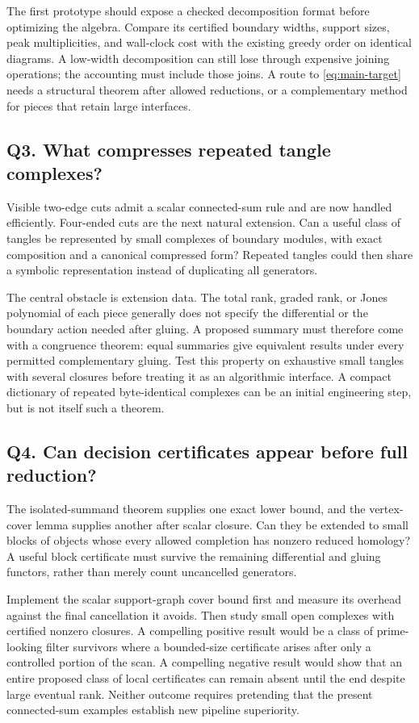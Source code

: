 The first prototype should expose a checked decomposition format before
optimizing the algebra.  Compare its certified boundary widths, support
sizes, peak multiplicities, and wall-clock cost with the existing greedy
order on identical diagrams.  A low-width decomposition can still lose
through expensive joining operations; the accounting must include those
joins.  A route to \eqref{eq:main-target} needs a structural theorem after
allowed reductions, or a complementary method for pieces that retain large
interfaces.

\subsection{Q3. What compresses repeated tangle complexes?}

Visible two-edge cuts admit a scalar connected-sum rule and are now handled
efficiently.  Four-ended cuts are the next natural extension.  Can a useful
class of tangles be represented by small complexes of boundary modules,
with exact composition and a canonical compressed form?  Repeated tangles
could then share a symbolic representation instead of duplicating all
generators.

The central obstacle is extension data.  The total rank, graded rank, or
Jones polynomial of each piece generally does not specify the differential
or the boundary action needed after gluing.  A proposed summary must therefore
come with a congruence theorem: equal summaries give equivalent results under
every permitted complementary gluing.  Test this property on exhaustive
small tangles with several closures before treating it as an algorithmic
interface.  A compact dictionary of repeated byte-identical complexes can
be an initial engineering step, but is not itself such a theorem.

\subsection{Q4. Can decision certificates appear before full reduction?}

The isolated-summand theorem supplies one exact lower bound, and the
vertex-cover lemma supplies another after scalar closure.  Can they be
extended to small blocks of objects whose every allowed completion has
nonzero reduced homology?  A useful block certificate must survive the
remaining differential and gluing functors, rather than merely count
uncancelled generators.

Implement the scalar support-graph cover bound first and measure its overhead
against the final cancellation it avoids.  Then study small open complexes
with certified nonzero closures.  A compelling positive result would be a
class of prime-looking filter survivors where a bounded-size certificate
arises after only a controlled portion of the scan.  A compelling negative
result would show that an entire proposed class of local certificates can
remain absent until the end despite large eventual rank.  Neither outcome
requires pretending that the present connected-sum examples establish new
pipeline superiority.

